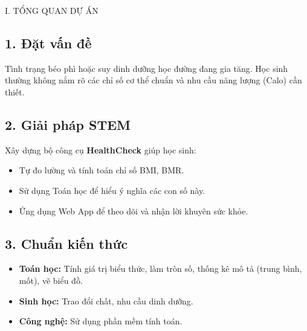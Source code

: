 \documentclass[12pt,a4paper]{article}
\begin{document}
\begin{sectionbox}{I. TỔNG QUAN DỰ ÁN}
\subsection*{1. Đặt vấn đề}
Tình trạng béo phì hoặc suy dinh dưỡng học đường đang gia tăng. Học sinh thường không nắm rõ các chỉ số cơ thể chuẩn và nhu cầu năng lượng (Calo) cần thiết.

\subsection*{2. Giải pháp STEM}
Xây dựng bộ công cụ \textbf{HealthCheck} giúp học sinh:
\begin{itemize}
    \item Tự đo lường và tính toán chỉ số BMI, BMR.
    \item Sử dụng Toán học để hiểu ý nghĩa các con số này.
    \item Ứng dụng Web App để theo dõi và nhận lời khuyên sức khỏe.
\end{itemize}

\subsection*{3. Chuẩn kiến thức}
\begin{itemize}
    \item \textbf{Toán học:} Tính giá trị biểu thức, làm tròn số, thống kê mô tả (trung bình, mốt), vẽ biểu đồ.
    \item \textbf{Sinh học:} Trao đổi chất, nhu cầu dinh dưỡng.
    \item \textbf{Công nghệ:} Sử dụng phần mềm tính toán.
\end{itemize}
\end{sectionbox}
\end{document}
